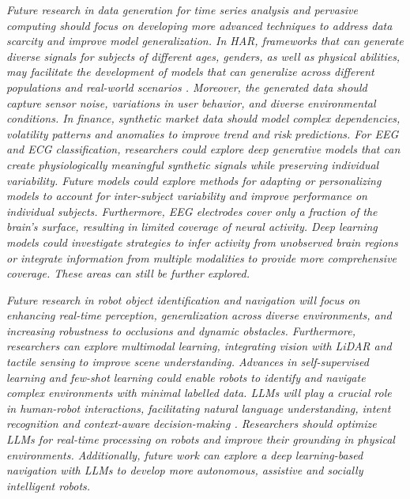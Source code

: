 \documentclass[preprint,12pt]{elsarticle}
\begin{document}
\emph{Future research in data generation for time series analysis and pervasive computing should focus on developing more advanced techniques to address data scarcity and improve model generalization. In HAR, frameworks that can generate diverse signals for subjects of different ages, genders, as well as physical abilities, may facilitate the development of models that can generalize across different populations and real-world scenarios \citep{jimale_subject_2023}. Moreover, the generated data should capture sensor noise, variations in user behavior, and diverse environmental conditions. In finance, synthetic market data should model complex dependencies, volatility patterns and anomalies to improve trend and risk predictions. For EEG and ECG classification, researchers could explore deep generative models that can create physiologically meaningful synthetic signals while preserving individual variability. Future models could explore methods for adapting or personalizing models to account for inter-subject variability and improve performance on individual subjects. Furthermore, EEG electrodes cover only a fraction of the brain's surface, resulting in limited coverage of neural activity. Deep learning models could investigate strategies to infer activity from unobserved brain regions or integrate information from multiple modalities to provide more comprehensive coverage. These areas can still be further explored.}

\emph{Future research in robot object identification and navigation will focus on enhancing real-time perception, generalization across diverse environments, and increasing robustness to occlusions and dynamic obstacles. Furthermore, researchers can explore multimodal learning, integrating vision with LiDAR and tactile sensing to improve scene understanding. Advances in self-supervised learning and few-shot learning could enable robots to identify and navigate complex environments with minimal labelled data. LLMs will play a crucial role in human-robot interactions, facilitating natural language understanding, intent recognition and context-aware decision-making \citep{zhang_large_2023}. Researchers should optimize LLMs for real-time processing on robots and improve their grounding in physical environments. Additionally, future work can explore a deep learning-based navigation with LLMs to develop more autonomous, assistive and socially intelligent robots.}
\end{document}
